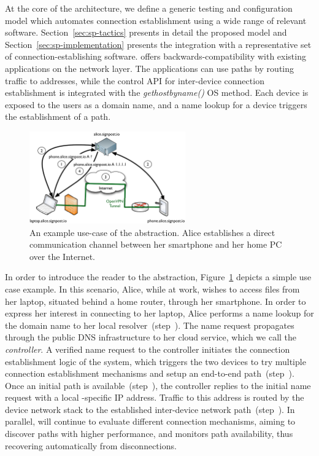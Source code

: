 At the core of the \signpost architecture, we define a generic testing and
configuration model which automates connection establishment using a wide range
of relevant software. Section~\ref{sec:sp-tactics} presents in detail the
proposed model and Section~\ref{sec:sp-implementation} presents the integration
with a representative set of connection-establishing software. \signpost offers
backwards-compatibility with existing applications on the network layer. The
applications can use \signpost paths by routing traffic to  \signpost addresses,
while the control API for inter-device connection establishment is integrated
with the \textit{gethostbyname()} OS method.  Each device is exposed to the
users as a domain name, and a name lookup for a device triggers the establishment
of a \signpost path. 

\begin{figure}[ht]
  \begin{center}
	\includegraphics[width=0.6\textwidth]{Chapter3/Chapter3Figs/sp-illustration}
  \end{center}
  \caption[\signpost example use-case.]{An example use-case of the \signpost
    abstraction. Alice establishes a direct communication channel between
    her smartphone and her home PC over the Internet.}
  \label{fig:signpost-user-abstraction}
\end{figure}

In order to introduce the reader to the \signpost abstraction, 
Figure~\ref{fig:signpost-user-abstraction} depicts a simple use case example.  In this
scenario, Alice, while at work, wishes to access
files from her laptop, situated behind a home router, through her smartphone. In order to express
her interest in connecting to her laptop, Alice performs a name lookup for the domain
name  to her local \signpost resolver~(step~).  The
name request propagates through the public DNS infrastructure to her \signpost
cloud service, which we call the {\it \signpost controller}. A verified name
request to the \signpost controller initiates the connection establishment logic
of the system, which triggers the two devices to try multiple connection
establishment mechanisms and setup an end-to-end path~(step~). Once an
initial path is available~(step~), the controller replies to the
initial name request with a local \signpost-specific IP address. Traffic to this
address is routed by the device network stack to the established inter-device
network path~(step~).  In parallel, \signpost will continue to evaluate
different connection mechanisms, aiming to discover paths with higher
performance, and monitors path availability, thus recovering automatically
from disconnections. 

